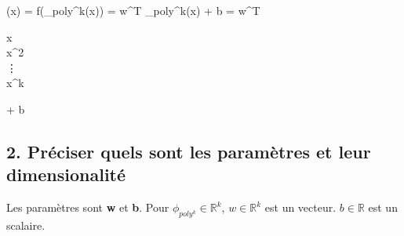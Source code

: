\documentclass[12pt]{article}
\newenvironment{eqs*}{\begin{equation*}\begin{aligned}}{\end{aligned}\end{equation*}}
\begin{document}
	\begin{eqs*}
		(x) = f(\phi_{poly^{k}}(x)) = w^{T} \phi_{poly^{k}}(x) + b = w^{T}\begin{bmatrix}
																			x \\
																			x^{2} \\
																			\vdots \\
																			x^{k}
																			\end{bmatrix} + b
	\end{eqs*}


\subsection{2. Préciser quels sont les paramètres et leur dimensionalité}

Les paramètres sont \textbf{w} et \textbf{b}. Pour $\phi_{poly^{k}} \in \mathbb{R}^{k}$, $w \in \mathbb{R}^{k}$ est un vecteur. $b \in \mathbb{R}$ est un scalaire.
\end{document}
